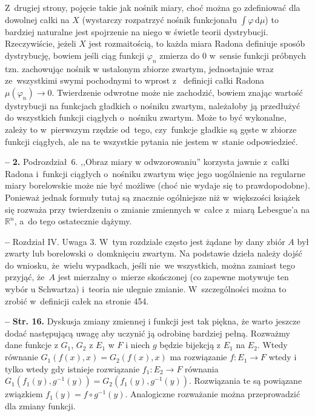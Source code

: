 \documentclass[a4paper]{article}
\newcommand{\mb}{\mathbb}
\newcommand{\mr}{\mathrm}
\newcommand{\de}{\mr{d}}
\newcommand{\R}{\mb{R}}
\newcommand{\ra}{\rightarrow}
\newcommand{\tb}{\textbf}
\newcommand{\noi}{\noindent}
\newcommand{\start}{\noi \tb{--} {}}
\newcommand{\Str}[1]{\tb{Str. #1.}}
\begin{document}
Z~drugiej strony, pojęcie takie jak nośnik miary, choć można go
zdefiniować dla dowolnej całki na $X$ (wystarczy rozpatrzyć nośnik
funkcjonału $\int \varphi \, \de \mu$) to bardziej naturalne jest
spojrzenie na niego w świetle teorii dystrybucji. Rzeczywiście, jeżeli
$X$ jest rozmaitością, to każda miara Radona definiuje sposób
dystrybucję, bowiem jeśli ciąg funkcji $\varphi_{ n }$ zmierza do 0
w~sensie funkcji próbnych tzn. zachowując nośnik w ustalonym zbiorze
zwartym, jednostajnie wraz ze~wszystkimi swymi pochodnymi to wprost z~
definicji całki Radona $\mu( \varphi_{ n } ) \ra 0$. Twierdzenie
odwrotne może nie zachodzić, bowiem znając wartość dystrybucji na
funkcjach gładkich o nośniku zwartym, należałoby ją przedłużyć do
wszystkich funkcji ciągłych o~nośniku zwartym. Może to być wykonalne,
zależy to w~pierwszym rzędzie od~tego, czy~funkcje gładkie są gęste w
zbiorze funkcji ciągłych, ale na te wszystkie pytania nie jestem
w~stanie odpowiedzieć.

\start \tb{2.} Podrozdział~6. ,,Obraz miary w odwzorowaniu'' korzysta
jawnie z~całki Radona i~funkcji ciągłych o~nośniku zwartym więc jego
uogólnienie na regularne miary borelowskie może nie być możliwe (choć
nie wydaje się to prawdopodobne). Ponieważ jednak formuły tutaj są
znacznie ogólniejsze niż w~większości książek się rozważa przy
twierdzeniu o zmianie zmiennych w~całce z~miarą Lebesgue'a na
$\R^{ n }$, a~do tego ostatecznie dążymy.
  
\start Rozdział IV. Uwaga 3. W~tym rozdziale często jest żądane by
dany zbiór $A$ był zwarty lub borelowski o~domknięciu zwartym. Na
podstawie dzieła \cite{VBMTI} należy dojść do wniosku, że~wielu
wypadkach, jeśli nie~we wszystkich, można zamiast tego przyjąć, że~$A$
jest mierzalny o~mierze skończonej (co zapewne motywuje ten wybór u
Schwartza) i~teoria nie ulegnie zmianie. W~szczególności można to
zrobić w~definicji całek na stronie 454.

\start \Str{16} Dyskusja zmiany zmiennej i funkcji jest tak piękna, że
warto jeszcze dodać następującą uwagę aby uczynić ją odrobinę bardziej
pełną. Rozważmy dane funkcje z $G_{ 1 }$, $G_{ 2 }$ z $E_{ 1 }$ w $F$
i niech $g$ będzie bijekcją z $E_{ 1 }$ na $E_{ 2 }$. Wtedy równanie
$G_{ 1 }( f( x ), x ) = G_{ 2 }( f( x ), x )$ ma rozwiązanie
$f : E_{ 1 } \ra F$ wtedy i tylko wtedy gdy istnieje rozwiązanie
$f_{ 1 } : E_{ 2 } \ra F$ równania
$G_{ 1 }( f_{ 1 }( y ), g^{ -1 }( y ) ) = G_{ 2 }( f_{ 1 }( y ), g^{
  -1 }( y ) )$. Rozwiązania te są powiązane związkiem
$f_{ 1 }( y ) = f \circ g^{ -1 }( y )$. Analogiczne rozważanie można
przeprowadzić dla zmiany funkcji.
  
\end{document}
